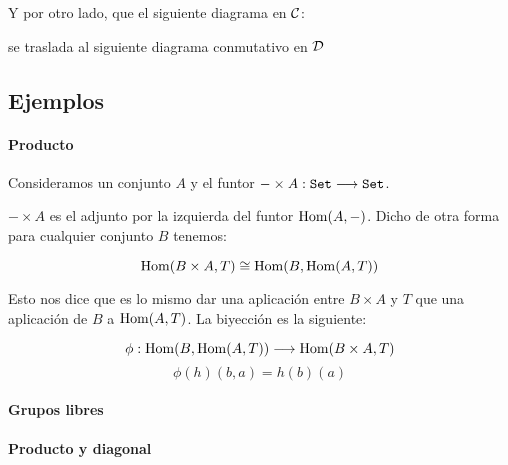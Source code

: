 Y por otro lado, que el siguiente diagrama en $\mathcal{C}$:

\begin{center}
\end{center}

se traslada al siguiente diagrama conmutativo en $\mathcal{D}$

\begin{center}
\end{center}

\subsection{Ejemplos}
\paragraph{Producto}


Consideramos un conjunto $A$ y el funtor $-\times A : \texttt{Set}\longrightarrow \texttt{Set}$.

$-\times A$ es el adjunto por la izquierda del funtor $\operatorname{Hom}(A, -)$.
Dicho de otra forma para cualquier conjunto $B$ tenemos:

$$\operatorname{Hom}(B\times A, T) \cong \operatorname{Hom}(B, \operatorname{Hom}(A, T))$$

Esto nos dice que es lo mismo dar una aplicación entre
$B\times A$ y $T$ que una aplicación de $B$ a $\operatorname{Hom}(A, T)$. La
biyección es la siguiente:

$$\phi: \operatorname{Hom}(B, \operatorname{Hom}(A, T))\longrightarrow \operatorname{Hom}(B\times A, T)$$
$$\phi(h)(b, a) = h(b)(a)$$

\paragraph{Grupos libres}

\paragraph{Producto y diagonal}
